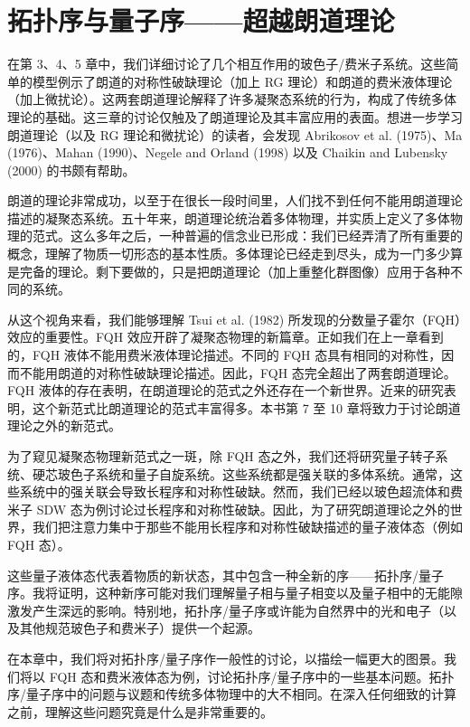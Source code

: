 

\chapter{拓扑序与量子序——超越朗道理论}

在第 3、4、5 章中，我们详细讨论了几个相互作用的玻色子/费米子系统。这些简单的模型例示了朗道的对称性破缺理论（加上 RG 理论）和朗道的费米液体理论（加上微扰论）。这两套朗道理论解释了许多凝聚态系统的行为，构成了传统多体理论的基础。这三章的讨论仅触及了朗道理论及其丰富应用的表面。想进一步学习朗道理论（以及 RG 理论和微扰论）的读者，会发现 Abrikosov et al. (1975)、Ma (1976)、Mahan (1990)、Negele and Orland (1998) 以及 Chaikin and Lubensky (2000) 的书颇有帮助。

朗道的理论非常成功，以至于在很长一段时间里，人们找不到任何不能用朗道理论描述的凝聚态系统。五十年来，朗道理论统治着多体物理，并实质上定义了多体物理的范式。这么多年之后，一种普遍的信念业已形成：我们已经弄清了所有重要的概念，理解了物质一切形态的基本性质。多体理论已经走到尽头，成为一门多少算是完备的理论。剩下要做的，只是把朗道理论（加上重整化群图像）应用于各种不同的系统。

从这个视角来看，我们能够理解 Tsui et al. (1982) 所发现的分数量子霍尔（FQH）效应的重要性。FQH 效应开辟了凝聚态物理的新篇章。正如我们在上一章看到的，FQH 液体不能用费米液体理论描述。不同的 FQH 态具有相同的对称性，因而不能用朗道的对称性破缺理论描述。因此，FQH 态完全超出了两套朗道理论。FQH 液体的存在表明，在朗道理论的范式之外还存在一个新世界。近来的研究表明，这个新范式比朗道理论的范式丰富得多。本书第 7 至 10 章将致力于讨论朗道理论之外的新范式。

为了窥见凝聚态物理新范式之一斑，除 FQH 态之外，我们还将研究量子转子系统、硬芯玻色子系统和量子自旋系统。这些系统都是强关联的多体系统。通常，这些系统中的强关联会导致长程序和对称性破缺。然而，我们已经以玻色超流体和费米子 SDW 态为例讨论过长程序和对称性破缺。因此，为了研究朗道理论之外的世界，我们把注意力集中于那些不能用长程序和对称性破缺描述的量子液体态（例如 FQH 态）。

这些量子液体态代表着物质的新状态，其中包含一种全新的序——拓扑序/量子序。我将证明，这种新序可能对我们理解量子相与量子相变以及量子相中的无能隙激发产生深远的影响。特别地，拓扑序/量子序或许能为自然界中的光和电子（以及其他规范玻色子和费米子）提供一个起源。

在本章中，我们将对拓扑序/量子序作一般性的讨论，以描绘一幅更大的图景。我们将以 FQH 态和费米液体态为例，讨论拓扑序/量子序中的一些基本问题。拓扑序/量子序中的问题与议题和传统多体物理中的大不相同。在深入任何细致的计算之前，理解这些问题究竟是什么是非常重要的。

